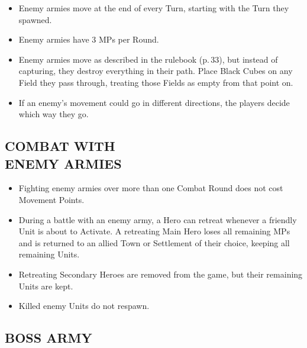 \begin{multicols}{2}
\begin{itemize}
  \item Enemy armies move at the end of every Turn, starting with the Turn they spawned.
  \item Enemy armies have 3 MPs per Round.
  \item Enemy armies move as described in the rulebook (p.\,33), but instead of capturing, they destroy everything in their path.
    Place Black Cubes on any Field they pass through, treating those Fields as empty from that point on.
  \item If an enemy's movement could go in different directions, the players decide which way they go.
\end{itemize}

\subsection*{\MakeUppercase{Combat with\\Enemy Armies}}

\begin{itemize}
  \item Fighting enemy armies over more than one Combat Round does not cost Movement Points.
  \item During a battle with an enemy army, a Hero can retreat whenever a friendly Unit is about to Activate.
    A retreating Main Hero loses all remaining MPs and is returned to an allied Town or Settlement of their choice, keeping all remaining Units.
  \item Retreating Secondary Heroes are removed from the game, but their remaining Units are kept.
  \item Killed enemy Units do not respawn.
\end{itemize}

\subsection*{\MakeUppercase{Boss Army}}


\end{multicols}
